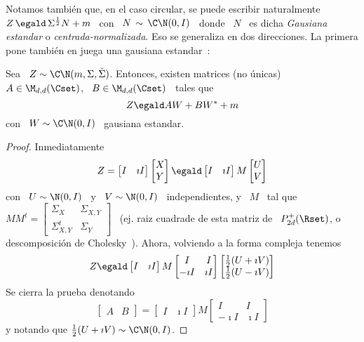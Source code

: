 Notamos tambi\'en que, en el caso  circular, se puede escribir naturalmente \ $Z
\, \egald \, \Sigma^{\frac12} N + m$ \  con \ $N \, \sim \, \C\N(0,I)$ \ donde \
$N$ \  es dicha  {\em Gausiana estandar}  o {\em centrada-normalizada}.   Eso se
generaliza en dos direcciones.  La  primera pone tambi\'en en juega una gausiana
estandar~\cite{Lap17}:
%
\begin{teorema}
\label{Teo:MP:GausianaComplejaWWestrella}
%
Sea \  $Z \sim  \C\N(m,\Sigma,\check{\Sigma})$.  Entonces, existen  matrices (no
\'unicas) \ $A \in \M_{d,d}(\Cset)$, \ $B \in \M_{d,d}(\Cset)$ \ tales que
  \[
  Z \egald A W + B W^* + m
  \]
  con \ $W \sim \C\N(0,I)$ \ gausiana estandar.
\end{teorema}
\begin{proof}
  Inmediatamente
  \[
  Z   =  \begin{bmatrix}   I   &  \imath   I\end{bmatrix}  \begin{bmatrix}   X\\
    Y\end{bmatrix}
  \egald \begin{bmatrix} I & \imath I\end{bmatrix} M \begin{bmatrix} U\\
    V\end{bmatrix}
  \]
  con \ $U \sim \N(0,I)$ \ y \  $V \sim \N(0,I)$ \ independientes, y \ $M$ \ tal
  que  \ $M  M^t =  \begin{bmatrix} \Sigma_X  & \Sigma_{X,Y}  \\  \Sigma_{X,Y}^t &
    \Sigma_Y  \end{bmatrix}$  \   (ej.  raiz  cuadrade  de  esta   matriz  de  \
  $P_{2d}^+(\Rset)$,    o     descomposici\'on    de    Cholesky~\cite{HorJoh13,
    Bha07}). Ahora, volviendo a la forma compleja tenemos
  \[
  Z     \egald   \begin{bmatrix}    I   &   \imath   I\end{bmatrix}
  M \begin{bmatrix} I  & I\\ -\imath I &  \imath I \end{bmatrix} \begin{bmatrix}
    \frac12 (U + \imath V)\\ \frac12 (U - \imath V)\end{bmatrix}
  \]
  Se cierra la prueba denotando
  \[
  \begin{bmatrix}   A   &   B\end{bmatrix}   =  \begin{bmatrix} I &
    \imath  I\end{bmatrix}  M  \begin{bmatrix}  I  &  I\\  -\imath  I  &  \imath
    I \end{bmatrix}
  \]
  y notando que $\frac12 (U + \imath V) \sim \C\N(0,I)$.
\end{proof}

